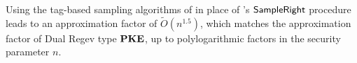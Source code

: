 Using the tag-based sampling algorithms of \cite{EC:MicPei12} in place of \cite{EC:AgrBonBoy10}'s $\mathsf{SampleRight}$ procedure leads to an approximation factor of $\widetilde{O}(n^{1.5})$, which matches the approximation factor of Dual Regev type $\mathbf{PKE}$, up to polylogarithmic factors in the security parameter $n$.


